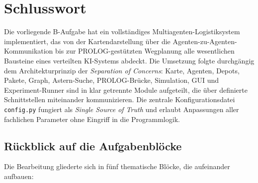 
\chapter{Schlusswort}
\label{chap:schlusswort}

Die vorliegende B-Aufgabe hat ein vollständiges Multiagenten-Logistiksystem implementiert, das von der Kartendarstellung über die Agenten-zu-Agenten-Kommunikation bis zur \acs{PROLOG}-gestützten Wegplanung alle wesentlichen Bausteine eines verteilten \acs{KI}-Systems abdeckt. Die Umsetzung folgte durchgängig dem Architekturprinzip der \textit{Separation of Concerns}: Karte, Agenten, Depots, Pakete, Graph, \acs{Astern}-Suche, \acs{PROLOG}-Brücke, Simulation, \acs{GUI} und Experiment-Runner sind in klar getrennte Module aufgeteilt, die über definierte Schnittstellen miteinander kommunizieren. Die zentrale Konfigurationsdatei \texttt{config.py} fungiert als \textit{Single Source of Truth} und erlaubt Anpassungen aller fachlichen Parameter ohne Eingriff in die Programmlogik.

\section{Rückblick auf die Aufgabenblöcke}

Die Bearbeitung gliederte sich in fünf thematische Blöcke, die aufeinander aufbauen:

